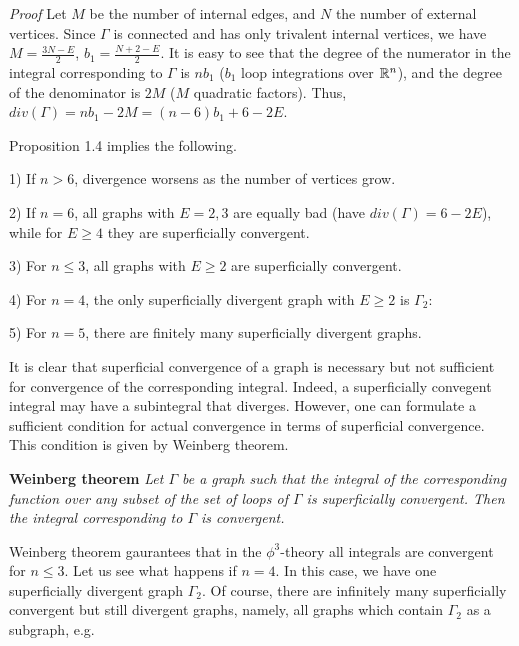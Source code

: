 \documentclass[11pt]{article}
\def\proclaim#1{{\bf #1} \it}
\def\endproclaim{\normalfont}
\def\R{\Bbb R}
\begin{document}
{\it Proof} Let $M$ be the number of internal edges, 
and $N$ the number of external vertices. 
Since $\Gamma$ is connected and has only trivalent
internal vertices, we have $M=\frac{3N-E}{2}$, $b_1=\frac{N+2-E}{2}$.
It is easy to see that the degree of the numerator in the integral
corresponding to $\Gamma$ is $nb_1$ ($b_1$ loop integrations over $\R^n$), 
and the degree of the denominator is $2M$ ($M$ quadratic factors).
Thus, $div(\Gamma)=nb_1-2M=(n-6)b_1+6-2E$. 

Proposition 1.4 implies the following.

1) If $n>6$, divergence worsens as the number of vertices grow. 

2) If $n=6$, all graphs with $E=2,3$ 
are equally bad (have $div(\Gamma)=6-2E$), while for $E\ge 4$ they are 
superficially convergent.

3) For $n\le 3$, all graphs with $E\ge 2$ are superficially convergent.  
 
4)   For $n=4$, the only superficially divergent graph with $E\ge 2$ is
$\Gamma_2$:

\hfill

\begin{center} 

 
\end{center}

\hfill


5) For $n=5$, there are finitely
many superficially divergent graphs.  
 
It is clear that superficial convergence of a graph is necessary
but not sufficient for convergence of the corresponding integral. 
Indeed, a superficially convegent integral may have a subintegral
that diverges. However, one can formulate a sufficient condition for actual
convergence in terms of superficial convergence. This condition is given 
by Weinberg theorem. 

\proclaim{Weinberg theorem} Let $\Gamma$ be a graph such that the integral
of the corresponding function over any subset of the set of loops of $\Gamma$
is superficially convergent. Then the integral corresponding to $\Gamma$
is convergent. 
\endproclaim

Weinberg theorem gaurantees that in the $\phi^3$-theory all integrals 
are convergent for $n\le 3$. Let us see what happens if $n=4$. 
In this case, we have one superficially divergent graph $\Gamma_2$.
Of course, there are infinitely many superficially convergent but still
divergent graphs, namely, all graphs which contain $\Gamma_2$ as a 
subgraph, e.g.
\end{document}
